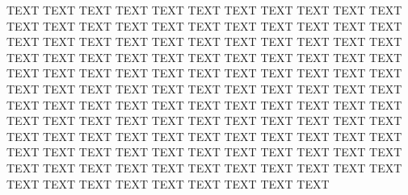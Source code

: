 %
%
TEXT TEXT TEXT TEXT TEXT TEXT TEXT TEXT TEXT TEXT TEXT TEXT TEXT 
TEXT TEXT TEXT TEXT TEXT TEXT TEXT TEXT TEXT TEXT TEXT TEXT TEXT 
TEXT TEXT TEXT TEXT TEXT TEXT TEXT TEXT TEXT TEXT TEXT TEXT TEXT 
TEXT TEXT TEXT TEXT TEXT TEXT TEXT TEXT TEXT TEXT TEXT TEXT TEXT 
TEXT TEXT TEXT TEXT TEXT TEXT TEXT TEXT TEXT TEXT TEXT TEXT TEXT 
TEXT TEXT TEXT TEXT TEXT TEXT TEXT TEXT TEXT TEXT TEXT TEXT TEXT 
TEXT TEXT TEXT TEXT TEXT TEXT TEXT TEXT TEXT TEXT TEXT TEXT TEXT 
TEXT TEXT TEXT TEXT TEXT TEXT TEXT TEXT TEXT TEXT TEXT TEXT TEXT 
TEXT TEXT TEXT TEXT TEXT TEXT TEXT TEXT TEXT TEXT TEXT TEXT TEXT 
TEXT TEXT TEXT TEXT TEXT TEXT TEXT TEXT TEXT TEXT TEXT TEXT TEXT 
